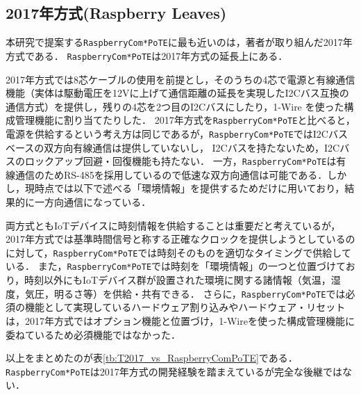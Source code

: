 {\subsection{2017年方式(Raspberry Leaves)}

本研究で提案する{\tt Raspberry\-Com*PoTE}に最も近いのは，著者が取り組んだ2017年方式である．
{\tt Raspberry\-Com*PoTE}は2017年方式の延長上にある．

2017年方式では8芯ケーブルの使用を前提とし，そのうちの4芯で電源と有線通信機能（実体は駆動電圧を12Vに上げて通信距離の延長を実現したI2Cバス互換の通信方式）を提供し，残りの4芯を2つ目のI2Cバスにしたり，1-Wire を使った構成管理機能に割り当てたりした．
2017年方式を{\tt Raspberry\-Com*PoTE}と比べると，電源を供給するという考え方は同じであるが，{\tt Raspberry\-Com*PoTE}ではI2Cバスベースの双方向有線通信は提供していないし，
I2Cバスを持たないため，I2Cバスのロックアップ回避・回復機能も持たない．
一方，{\tt Raspberry\-Com*PoTE}は有線通信のためRS-485を採用しているので低速な双方向通信は可能である．しかし，現時点では以下で述べる「環境情報」を提供するためだけに用いており，結果的に一方向通信になっている．

両方式ともIoTデバイスに時刻情報を供給することは重要だと考えているが，2017年方式では基準時間信号と称する正確なクロックを提供しようとしているのに対して，{\tt Raspberry\-Com*PoTE}では時刻そのものを適切なタイミングで供給している．
また，{\tt Raspberry\-Com*PoTE}では時刻を「環境情報」の一つと位置づけており，時刻以外にもIoTデバイス群が設置された環境に関する諸情報（気温，湿度，気圧，明るさ等）を供給・共有できる．
さらに，{\tt Raspberry\-Com*PoTE}では必須の機能として実現しているハードウェア割り込みやハードウェア・リセットは，2017年方式ではオプション機能と位置づけ，1-Wireを使った構成管理機能に委ねているため必須機能ではなかった．

以上をまとめたのが表\ref{tb:T2017_vs_RaspberryComPoTE}である．
{\tt Raspberry\-Com*PoTE}は2017年方式の開発経験を踏まえているが完全な後継ではない．

}
